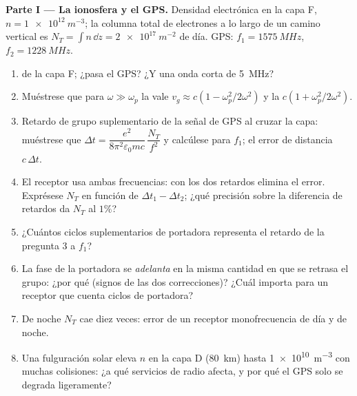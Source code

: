 \begin{problem}
\label{pb:b2:waves-in-media:1}

\medskip
\noindent\textbf{Parte I --- La ionosfera y el GPS.}
Densidad electrónica en la capa F, $n = \qty{1e12}{m^{-3}}$; la columna total de
electrones a lo largo de un camino vertical es $N_T = \int n\,\dd z = \qty{2e17}{m^{-2}}$ de
día. GPS: $f_1 = \qty{1575}{MHz}$, $f_2 = \qty{1228}{MHz}$.
\begin{enumerate}
  \item {} de la capa F; ¿pasa el GPS? ¿Y una onda
        corta de \qty{5}{MHz}?
  \item Muéstrese que para $\omega \gg \omega_p$ la  vale $v_g \approx c(1 -
        \omega_p^2/2\omega^2)$ y la  $c(1 + \omega_p^2/2\omega^2)$.
  \item Retardo de grupo suplementario de la señal de GPS al cruzar la capa: muéstrese que
        $\Delta t = \dfrac{e^2}{8\pi^2\varepsilon_0mc}\,\dfrac{N_T}{f^2}$ y calcúlese para
        $f_1$; el error de distancia $c\,\Delta t$.
  \item El receptor usa ambas frecuencias: con los dos retardos
        elimina el error. Exprésese $N_T$ en función de $\Delta t_1 - \Delta t_2$;
        ¿qué precisión sobre la diferencia de retardos da $N_T$ al $1\%$?
  \item ¿Cuántos ciclos suplementarios de portadora representa el retardo
        de la pregunta 3 a $f_1$?
  \item La fase de la portadora se \emph{adelanta} en la misma
        cantidad en que se retrasa el grupo: ¿por qué (signos de las dos
        correcciones)? ¿Cuál importa para un receptor que cuenta
        ciclos de portadora?
  \item De noche $N_T$ cae diez veces: error de un receptor
        monofrecuencia de día y de noche.
  \item Una fulguración solar eleva $n$ en la capa D (\qty{80}{km}) hasta
        \qty{1e10}{m^{-3}} con muchas colisiones: ¿a qué servicios de radio
        afecta, y por qué el GPS solo se degrada ligeramente?
\end{enumerate}


\end{problem}
